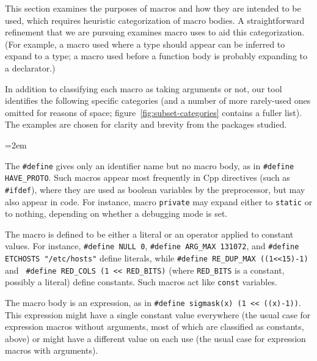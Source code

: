 \documentclass[11pt]{article}
\begin{document}
This section examines the purposes of macros and how they are intended to
be used, which requires heuristic categorization of macro bodies.  A
straightforward refinement that we are pursuing examines macro uses to aid
this categorization.  (For example, a macro used where a type should appear
can be inferred to expand to a type; a macro used before a function body is
probably expanding to a declarator.)

In addition to classifying each macro as taking arguments or not, our tool
identifies the following specific categories (and a number of more
rarely-used ones omitted for reasons of space;
figure~\ref{fig:subset-categories} contains a fuller list).  The examples
are chosen for clarity and brevity from the packages studied.

\begin{description}
  \sloppy
  \emergencystretch=2em

\item[Null define]  The {\tt \#define} gives only an
  identifier name but no macro body, as in {\tt \#define
  \verb|HAVE_PROTO|}\@.  Such macros appear most frequently in Cpp
directives (such as {\tt \#ifdef}), where they are used as boolean
variables by the preprocessor, but may also appear in code.  For instance,
macro {\tt private} may expand either to {\tt static} or to nothing,
depending on whether a debugging mode is set.

\item[Constant] The macro is defined to be either a literal or an operator
  applied to constant values.  For instance, {\tt \#define NULL 0}, {\tt \#define
  \verb|ARG_MAX| 131072}, and {\tt \#define ETCHOSTS "/etc/hosts"} define
literals, while {\tt \#define \verb|RE_DUP_MAX| ((1<<15)-1)} and {\tt
\#define \verb|RED_COLS| (1 << \verb|RED_BITS|)} (where \verb|RED_BITS| is
a constant, possibly a literal) define constants.  Such macros act like
{\tt const} variables.

\item[Expression]  The macro body is an expression, as in {\tt \#define
  sigmask(x) (1 << ((x)-1))}.  This expression might have a single constant
value everywhere (the usual case for expression macros without arguments,
most of which are classified as constants, above) or might have a
different value on each use (the usual case for expression macros with
arguments).


\end{description}
\end{document}
